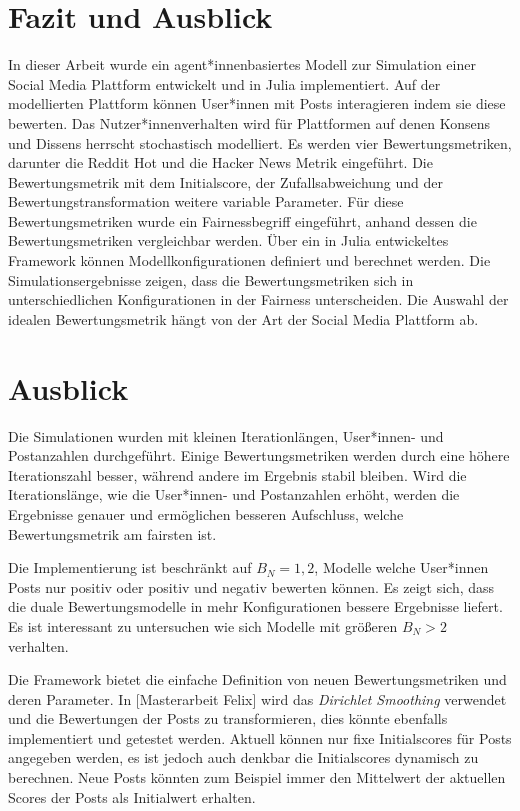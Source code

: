 \chapter{Fazit und Ausblick}

In dieser Arbeit wurde ein agent*innenbasiertes Modell zur Simulation einer Social Media Plattform entwickelt und in Julia implementiert. Auf der modellierten Plattform können User*innen mit Posts interagieren indem sie diese bewerten. Das Nutzer*innenverhalten wird für Plattformen auf denen Konsens und Dissens herrscht stochastisch modelliert. Es werden vier Bewertungsmetriken, darunter die Reddit Hot und die Hacker News Metrik eingeführt. Die Bewertungsmetrik mit dem Initialscore, der Zufallsabweichung und der Bewertungstransformation weitere variable Parameter. Für diese Bewertungsmetriken wurde ein Fairnessbegriff eingeführt, anhand dessen die Bewertungsmetriken vergleichbar werden. Über ein in Julia entwickeltes Framework können Modellkonfigurationen definiert und berechnet werden. Die Simulationsergebnisse zeigen, dass die Bewertungsmetriken sich in unterschiedlichen Konfigurationen in der Fairness unterscheiden. Die Auswahl der idealen Bewertungsmetrik hängt von der Art der Social Media Plattform ab.



\chapter*{Ausblick}

Die Simulationen wurden mit kleinen Iterationlängen, User*innen- und Postanzahlen durchgeführt. Einige Bewertungsmetriken werden durch eine höhere Iterationszahl besser, während andere im Ergebnis stabil bleiben. Wird die Iterationslänge, wie die User*innen- und Postanzahlen erhöht, werden die Ergebnisse genauer und ermöglichen besseren Aufschluss, welche Bewertungsmetrik am fairsten ist.


Die Implementierung ist beschränkt auf $B_N = {1,2}$, Modelle welche User*innen Posts nur positiv oder positiv und negativ bewerten können. Es zeigt sich, dass die duale Bewertungsmodelle in mehr Konfigurationen bessere Ergebnisse liefert. Es ist interessant zu untersuchen wie sich Modelle mit größeren $B_N > 2$ verhalten.


Die Framework bietet die einfache Definition von neuen Bewertungsmetriken und deren Parameter. In [Masterarbeit Felix] wird das \textit{Dirichlet Smoothing} verwendet und die Bewertungen der Posts zu transformieren, dies könnte ebenfalls implementiert und getestet werden. Aktuell können nur fixe Initialscores für Posts angegeben werden, es ist jedoch auch denkbar die Initialscores dynamisch zu berechnen. Neue Posts könnten zum Beispiel immer den Mittelwert der aktuellen Scores der Posts als Initialwert erhalten.

